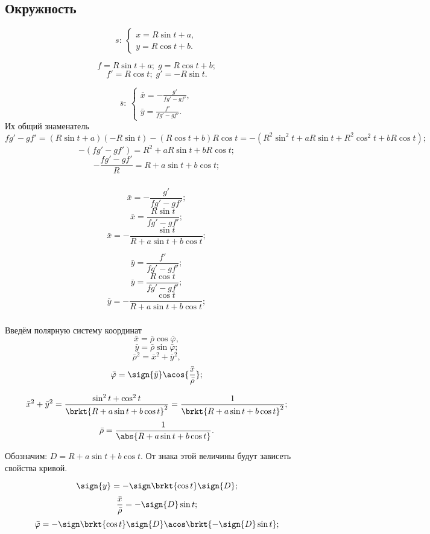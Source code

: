 \subsection{Окружность}
$$s: \: 
\left\{ \begin{gathered}
	x = R\sin{t}+a,\\
	y = R\cos{t}+b.
\end{gathered} \right.
$$

$$f = R\sin{t}+a; \; g = R\cos{t}+b;$$
$$f' = R\cos{t}; \; g' = -R\sin{t}.$$

$$\bar{s}:
\:
\left\{
\begin{gathered}
	\bar{x} =  -\frac{g'}{f g' - g f'},\\
	\bar{y} =  \frac{f'}{f g' - g f'}.
\end{gathered}
\right.
$$
Их общий знаменатель 
$$f g' - g f' = (R\sin{t}+a)(-R\sin{t}) - (R\cos{t}+b) R\cos{t} = -\left(R^2\sin^2{t}+aR\sin{t} + R^2\cos^2{t} +bR\cos{t}\right);$$
$$-(f g' - g f') = R^2 + aR\sin{t} + bR\cos{t};$$
$$-\frac{f g' - g f'}{R} = R + a\sin{t} + b\cos{t};$$

\subparagraph{}
\begin{minipage}{0.4\textwidth}
$$\bar{x} =  -\frac{g'}{f g' - g f'};$$
$$\bar{x} =  \frac{R \sin{t}}{f g' - g f'};$$
$$\bar{x} =  -\frac{\sin{t}}{R + a\sin{t} + b\cos{t}};$$

\end{minipage}
\begin{minipage}{0.4\textwidth}
$$\bar{y} =  \frac{f'}{f g' - g f'};$$
$$\bar{y} =  \frac{R \cos{t}}{f g' - g f'};$$
$$\bar{y} =  -\frac{\cos{t}}{R + a\sin{t} + b\cos{t}};$$

\end{minipage}

\subparagraph{} Введём полярную систему координат
$$\bar{x} = \bar{\rho}\cos{\bar{\varphi}},$$
$$\bar{y} = \bar{\rho}\sin{\bar{\varphi}};$$
$$\bar{\rho}^2 = \bar{x}^2 + \bar{y}^2,$$
$$\bar{\varphi} = \sign{\bar{y}}\acos{\frac{\bar{x}}{\bar{\rho}}};$$

$$\bar{x}^2 + \bar{y}^2 
= \frac{\sin^2{t} + \cos^2{t}}{\brkt{R + a\sin{t} + b\cos{t}}^2}
= \frac{1}{\brkt{R + a\sin{t} + b\cos{t}}^2};$$
$$\bar{\rho} = \frac{1}{\abs{R + a\sin{t} + b\cos{t}}}.$$

Обозначим: $D = R + a\sin{t} + b\cos{t}$. От знака этой величины будут зависеть свойства кривой.

$$\sign{y} = -\sign\brkt{\cos{t}}\sign{D};$$
$$\frac{\bar{x}}{\bar{\rho}} = -\sign{D}\sin{t};$$
$$\bar{\varphi} = -\sign\brkt{\cos{t}}\sign{D}\acos\brkt{-\sign{D}\sin{t}};$$

